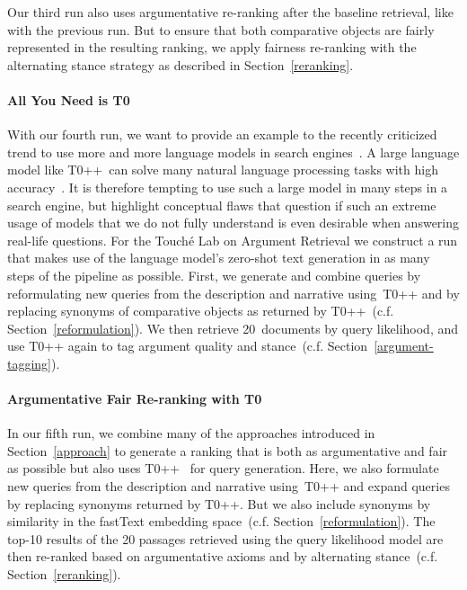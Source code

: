 Our third run also uses argumentative re-ranking after the baseline retrieval, like with the previous run. But to ensure that both comparative objects are fairly represented in the resulting ranking, we apply fairness re-ranking with the alternating stance strategy as described in Section~\ref{reranking}.

\paragraph{All You Need is T0}

With our fourth run, we want to provide an example to the recently criticized trend to use more and more language models in search engines~\cite{ShahB2022}.
A large language model like T0++~can solve many natural language processing tasks with high accuracy~\cite{SanhWRBSACSLRDBXTSSKCNDCJWMSYPBWNRSSFFTBGBWR2021}.
It is therefore tempting to use such a large model in many steps in a search engine, but \citet{ShahB2022} highlight conceptual flaws that question if such an extreme usage of models that we do not fully understand is even desirable when answering real-life questions.
For the Touché Lab on Argument Retrieval we construct a run that makes use of the language model's zero-shot text generation in as many steps of the pipeline as possible.
First, we generate and combine queries by reformulating new queries from the description and narrative using~T0++ and by replacing synonyms of comparative objects as returned by T0++~(c.f. Section~\ref{reformulation}).
We then retrieve 20~documents by query likelihood, and use T0++ again to tag argument quality and stance~(c.f. Section~\ref{argument-tagging}).

\paragraph{Argumentative Fair Re-ranking with T0}

In our fifth run, we combine many of the approaches introduced in Section~\ref{approach} to generate a ranking that is both as argumentative and fair as possible but also uses T0++~\cite{SanhWRBSACSLRDBXTSSKCNDCJWMSYPBWNRSSFFTBGBWR2021} for query generation.
Here, we also formulate new queries from the description and narrative using~T0++ and expand queries by replacing synonyms returned by T0++. But we also include synonyms by similarity in the fastText embedding space~(c.f. Section~\ref{reformulation}).
The top-10 results of the 20 passages retrieved using the query likelihood model are then re-ranked based on argumentative axioms and by alternating stance~(c.f. Section~\ref{reranking}).

